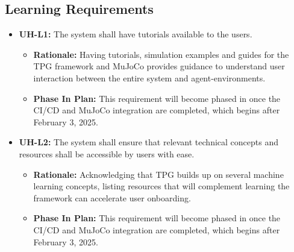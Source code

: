 \documentclass[12pt]{article}
\begin{document}
\subsection{Learning Requirements}
\begin{itemize}
  \item \label{UH-L1} \textbf{UH-L1:} The system shall have tutorials available to the users.
  \begin{itemize}
    \item \textbf{Rationale:} Having tutorials, simulation examples and guides for the TPG framework and MuJoCo provides guidance to understand user interaction between the entire system and agent-environments.
    \item  \textbf{Phase In Plan:} This requirement will become phased in once the CI/CD and MuJoCo integration are completed, which begins after February 3, 2025.
  \end{itemize}
  \item \label{UH-L2} \textbf{UH-L2:} The system shall ensure that relevant technical concepts and resources shall be accessible by users with ease.
  \begin{itemize}
    \item \textbf{Rationale:} Acknowledging that TPG builds up on several machine learning concepts, listing resources that will complement learning the framework can accelerate user onboarding.
    \item \textbf{Phase In Plan:}  This requirement will become phased in once the CI/CD and MuJoCo integration are completed, which begins after February 3, 2025.
  \end{itemize}
\end{itemize}
\end{document}

